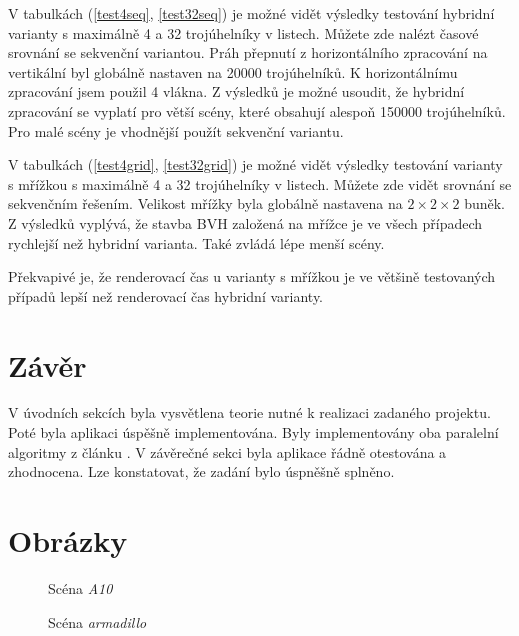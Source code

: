 \documentclass[11pt]{article}
\begin{document}
V tabulkách (\ref{test4seq}, \ref{test32seq}) je možné vidět výsledky testování hybridní varianty s maximálně 4 a 32 trojúhelníky v listech. Můžete zde nalézt časové srovnání se sekvenční variantou. Práh přepnutí z horizontálního zpracování na vertikální byl globálně nastaven na 20000 trojúhelníků. K horizontálnímu zpracování jsem použil 4 vlákna. Z výsledků je možné usoudit, že hybridní zpracování se vyplatí pro větší scény, které obsahují alespoň 150000 trojúhelníků. Pro malé scény je vhodnější použít sekvenční variantu.

V tabulkách (\ref{test4grid}, \ref{test32grid}) je možné vidět výsledky testování varianty s mřížkou s maximálně 4 a 32 trojúhelníky v listech. Můžete zde vidět srovnání se sekvenčním řešením. Velikost mřížky byla globálně nastavena na $2 \times 2 \times 2$ buněk. Z výsledků vyplývá, že stavba BVH založená na mřížce je ve všech případech rychlejší než hybridní varianta. Také zvládá lépe menší scény. 

Překvapivé je, že renderovací čas u varianty s mřížkou je ve většině testovaných případů lepší než renderovací čas hybridní varianty.

\section{Závěr}
V úvodních sekcích byla vysvětlena teorie nutné k realizaci zadaného projektu. Poté byla aplikaci úspěšně implementována. Byly implementovány oba paralelní algoritmy z článku \cite{wald}. V závěrečné sekci byla aplikace řádně otestována a zhodnocena. Lze konstatovat, že zadání bylo úspněšně splněno.

\vspace{3.0cm}




\appendix

\newpage
\section{Obrázky}
\label{pics}

\begin{figure}[h]
\setlength\fboxsep{1pt}
\centerline{}
\caption{Scéna \emph{A10}}
\end{figure}

\begin{figure}[h]
\setlength\fboxsep{1pt}
\centerline{}
\caption{Scéna \emph{armadillo}}
\end{figure}
\end{document}
